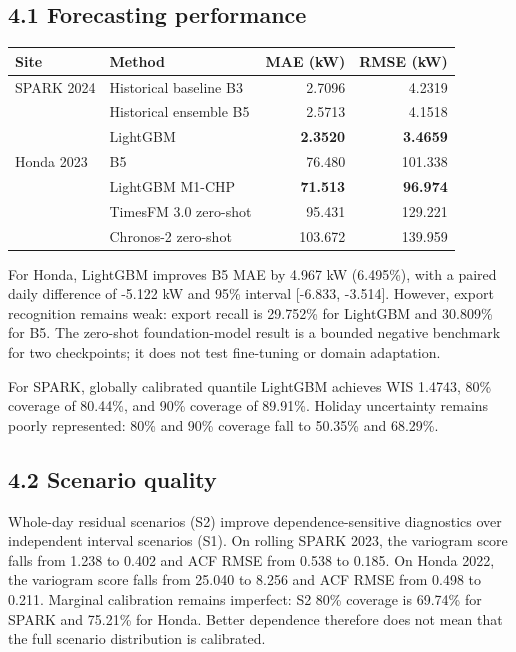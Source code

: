 \documentclass[10pt,a4paper]{article}
\begin{document}
\subsection*{4.1 Forecasting performance}

\begin{tabularx}{\textwidth}{p{}Xrr}
\toprule
Site & Method & MAE (kW) & RMSE (kW)\\
\midrule
SPARK 2024 & Historical baseline B3 & 2.7096 & 4.2319\\
 & Historical ensemble B5 & 2.5713 & 4.1518\\
 & LightGBM & \textbf{2.3520} & \textbf{3.4659}\\
\midrule
Honda 2023 & B5 & 76.480 & 101.338\\
 & LightGBM M1-CHP & \textbf{71.513} & \textbf{96.974}\\
 & TimesFM 3.0 zero-shot & 95.431 & 129.221\\
 & Chronos-2 zero-shot & 103.672 & 139.959\\
\bottomrule
\end{tabularx}

For Honda, LightGBM improves B5 MAE by 4.967 kW (6.495\%), with a paired daily
difference of -5.122 kW and 95\% interval [-6.833, -3.514]. However, export
recognition remains weak: export recall is 29.752\% for LightGBM and 30.809\%
for B5. The zero-shot foundation-model result is a bounded negative benchmark
for two checkpoints; it does not test fine-tuning or domain adaptation.

For SPARK, globally calibrated quantile LightGBM achieves WIS 1.4743, 80\%
coverage of 80.44\%, and 90\% coverage of 89.91\%. Holiday uncertainty remains
poorly represented: 80\% and 90\% coverage fall to 50.35\% and 68.29\%.

\subsection*{4.2 Scenario quality}

Whole-day residual scenarios (S2) improve dependence-sensitive diagnostics over
independent interval scenarios (S1). On rolling SPARK 2023, the variogram score
falls from 1.238 to 0.402 and ACF RMSE from 0.538 to 0.185. On Honda 2022, the
variogram score falls from 25.040 to 8.256 and ACF RMSE from 0.498 to 0.211.
Marginal calibration remains imperfect: S2 80\% coverage is 69.74\% for SPARK
and 75.21\% for Honda. Better dependence therefore does not mean that the full
scenario distribution is calibrated.
\end{document}
